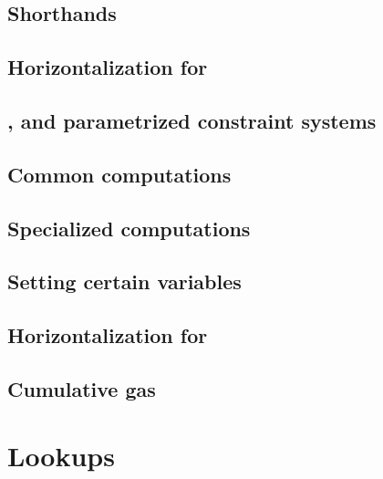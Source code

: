 \subsection{Shorthands}                                                     \label{txn_data: constraints: shorthands}                     
\subsection{Horizontalization for \rlpTxnMod{}}                             \label{txn_data: constraints: horizontalization rlpTxn}       
\subsection{\wcpFlag{}, \eucFlag{} and parametrized constraint systems}     \label{txn_data: constraints: comparison constraints}         
\subsection{Common computations}                                            \label{txn_data: constraints: common computations}            
\subsection{Specialized computations}                                       \label{txn_data: constraints: specialized computations}       
\subsection{Setting certain variables}                                      \label{txn_data: constraints: setting variables}              
\subsection{Horizontalization for \rlpTxnRcptMod{}}                         \label{txn_data: constraints: horizontalization rlpTxnRcpt}   
\subsection{Cumulative gas}                                                 \label{txn_data: constraints: cumulative gas}                 

\section{Lookups}                                                           \label{txn_data: lookups}                                 
